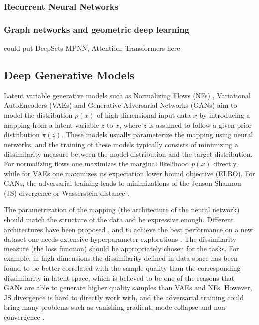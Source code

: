 
\subsubsection{Recurrent Neural Networks}\label{ML:sec:rnn}


\subsubsection{Graph networks and geometric deep learning}\label{ML:sec:gnn} 
could put DeepSets MPNN, Attention, Transformers here

\subsection{Deep Generative Models}\label{ML:sec:deep_generative}


Latent variable generative models such as Normalizing Flows (NFs) \cite{rezende2015variational,dinh2014nice,dinh2016density,kingma2018glow}, Variational AutoEncoders (VAEs) \cite{kingma2013auto,rezende2014stochastic} and Generative Adversarial Networks (GANs) \cite{goodfellow2014generative, radford2015unsupervised} aim to model the distribution $p(x)$ of high-dimensional input data $x$ by introducing a mapping from a latent variable $z$ to $x$, where $z$ is assumed to follow a given prior distribution $\pi(z)$. These models usually parameterize the mapping using neural networks, and the training of these models typically consists of minimizing a dissimilarity measure between the model distribution and the target distribution. For normalizing flows one maximizes the marginal likelihood $p(x)$ directly, while 
for VAEs one maximizes its expectation 
lower bound objective (ELBO). 
For GANs, the adversarial training leads to minimizations of the Jenson-Shannon (JS) divergence \cite{goodfellow2014generative} or Wasserstein distance \cite{}. 

The parametrization of the mapping (the architecture of the neural network) should match the structure of the data and be expressive enough. Different architectures have been proposed \cite{kingma2018glow, van2017neural,karras2017progressive, karras2019style}, 
and to achieve the best performance on a new dataset one needs extensive hyperparameter explorations \cite{lucic2018gans}.
The dissimilarity measure (the loss function) should be appropriately chosen for the tasks. For example, in high dimensions the dissimilarity defined in 
data space has been found to be better correlated with the 
sample quality than the corresponding 
dissimilarity in latent space, which is believed to be one of the reasons that GANs are able to generate higher quality samples than VAEs and NFs. However, JS divergence is hard to directly work with, and the adversarial training could bring many problems such as vanishing gradient, mode collapse and non-convergence \cite{arjovsky2017towards, wiatrak2019stabilizing}.


